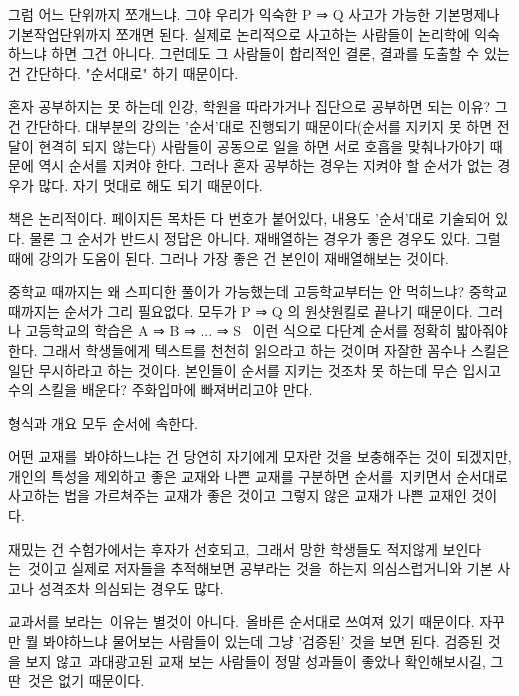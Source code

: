 그럼 어느 단위까지 쪼개느냐.
그야 우리가 익숙한 P ⇒ Q 사고가 가능한 기본명제나 기본작업단위까지 쪼개면 된다.
실제로 논리적으로 사고하는 사람들이 논리학에 익숙하느냐 하면 그건 아니다.
그런데도 그 사람들이 합리적인 결론, 결과를 도출할 수 있는 건 간단하다. "순서대로" 하기 때문이다.
\vspace{5mm}

혼자 공부하지는 못 하는데 인강, 학원을 따라가거나 집단으로 공부하면 되는 이유?
그건 간단하다. 대부분의 강의는 '순서'대로 진행되기 때문이다(순서를 지키지 못 하면 전달이 현격히 되지 않는다)
사람들이 공동으로 일을 하면 서로 호흡을 맞춰나가야기 때문에 역시 순서를 지켜야 한다.
그러나 혼자 공부하는 경우는 지켜야 할 순서가 없는 경우가 많다. 자기 멋대로 해도 되기 때문이다.
\vspace{5mm}

책은 논리적이다.
페이지든 목차든 다 번호가 붙어있다, 내용도 '순서'대로 기술되어 있다.
물론 그 순서가 반드시 정답은 아니다. 재배열하는 경우가 좋은 경우도 있다. 그럴 때에 강의가 도움이 된다.
그러나 가장 좋은 건 본인이 재배열해보는 것이다.
\vspace{5mm}

중학교 때까지는 왜 스피디한 풀이가 가능했는데 고등학교부터는 안 먹히느냐?
중학교 때까지는 순서가 그리 필요없다. 모두가 P ⇒ Q 의 원샷원킬로 끝나기 때문이다.
그러나 고등학교의 학습은 A ⇒ B ⇒ ... ⇒ S  이런 식으로 다단계 순서를 정확히 밟아줘야한다.
그래서 학생들에게 텍스트를 천천히 읽으라고 하는 것이며 자잘한 꼼수나 스킬은 일단 무시하라고 하는 것이다.
본인들이 순서를 지키는 것조차 못 하는데 무슨 입시고수의 스킬을 배운다? 주화입마에 빠져버리고야 만다.
\vspace{5mm}

형식과 개요 모두 순서에 속한다.
\vspace{5mm}

어떤 교재를 봐야하느냐는 건 당연히 자기에게 모자란 것을 보충해주는 것이 되겠지만,
개인의 특성을 제외하고 좋은 교재와 나쁜 교재를 구분하면
순서를 지키면서 순서대로 사고하는 법을 가르쳐주는 교재가 좋은 것이고
그렇지 않은 교재가 나쁜 교재인 것이다.
\vspace{5mm}

재밌는 건 수험가에서는 후자가 선호되고, 그래서 망한 학생들도 적지않게 보인다는 것이고
실제로 저자들을 추적해보면 공부라는 것을 하는지 의심스럽거니와 기본 사고나 성격조차 의심되는 경우도 많다.
\vspace{5mm}

교과서를 보라는 이유는 별것이 아니다. 올바른 순서대로 쓰여져 있기 때문이다.
자꾸만 뭘 봐야하느냐 물어보는 사람들이 있는데 그냥 '검증된' 것을 보면 된다.
검증된 것을 보지 않고 과대광고된 교재 보는 사람들이 정말 성과들이 좋았나 확인해보시길, 그딴 것은 없기 때문이다.
\vspace{5mm}

